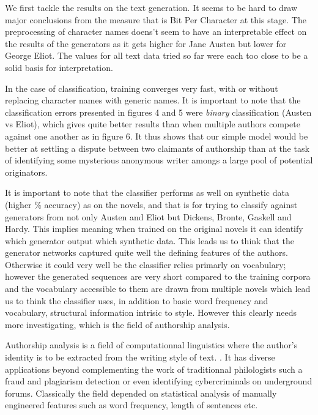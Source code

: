 We first tackle the results on the text generation. It seems to be hard to draw
major conclusions from the measure that is Bit Per Character at this stage. The
preprocessing of character names doens't seem to have an interpretable effect
on the results of the generators as it gets higher for Jane Austen but lower
for George Eliot. The values for all text data tried so far were each too close
to be a solid basis for interpretation.

In the case of classification, training converges very fast, with or without
replacing character names with generic names. It is important to note that the
classification errors presented in figures 4 and 5 were \textit{binary}
classification (Austen vs Eliot), which gives quite better results than when
multiple authors compete against one another as in figure 6.  It thus shows
that our simple model would be better at settling a dispute between two
claimants of authorship than at the task of identifying some mysterious
anonymous writer amongs a large pool of potential originators.


It is important to note that the classifier performs as well on synthetic data
(higher \% accuracy) as on the novels, and that is for trying to classify
against generators from not only Austen and Eliot but Dickens, Bronte, Gaskell
and Hardy.  This implies meaning when trained on the original novels it can
identify which generator output which synthetic data. This leads us to think
that the generator networks captured quite well the defining features of the
authors.  Otherwise it could very well be the classifier relies primarly on
vocabulary; however the generated sequences are very short compared to the
training corpora and the vocabulary accessible to them are drawn from multiple
novels which lead us to think the classifier uses, in addition to basic word
frequency and vocabulary, structural information intrisic to style. However
this clearly needs more investigating, which is the field of authorship
analysis.

Authorship analysis is a field of computationnal linguistics where
the author's identity is to be extracted from the writing style of text.
\cite{stylo}. It has diverse applications beyond complementing the
work of traditionnal philologists such a fraud and plagiarism detection
or even identifying cybercriminals on underground forums\cite{doppel}.
Classically the field depended on statistical analysis 
of manually engineered features such as word frequency, length of 
sentences etc. 

